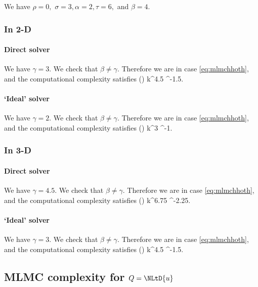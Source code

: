 We have $\rho=0,$ $\sigma = 3, \alpha = 2, \tau = 6,$ and $\beta = 4$.

\subsubsection{In 2-D}

\paragraph{Direct solver}

We have $\gamma = 3$. We check that  $\beta \neq \gamma.$ Therefore we are in case \eqref{eq:mlmchhoth}, and the computational complexity satisfies
\beqs
\CMLhL(\eps) \lesssim k^{4.5} \eps^{-1.5}.
\eeqs

\paragraph{`Ideal' solver}

We have $\gamma = 2$. We check that  $\beta \neq \gamma.$ Therefore we are in case \eqref{eq:mlmchhoth}, and the computational complexity satisfies
\beqs
\CMLhL(\eps) \lesssim k^3 \eps^{-1}.
\eeqs

\subsubsection{In 3-D}

\paragraph{Direct solver}

We have $\gamma = 4.5$. We check that  $\beta \neq \gamma.$ Therefore we are in case \eqref{eq:mlmchhoth}, and the computational complexity satisfies
\beqs
\CMLhL(\eps) \lesssim k^{6.75} \eps^{-2.25}.
\eeqs

\paragraph{`Ideal' solver}

We have $\gamma = 3$. We check that  $\beta \neq \gamma.$ Therefore we are in case \eqref{eq:mlmchhoth}, and the computational complexity satisfies
\beqs
\CMLhL(\eps) \lesssim k^{4.5} \eps^{-1.5}.
\eeqs

\subsection{MLMC complexity for $Q=\NLtD{u}$}

